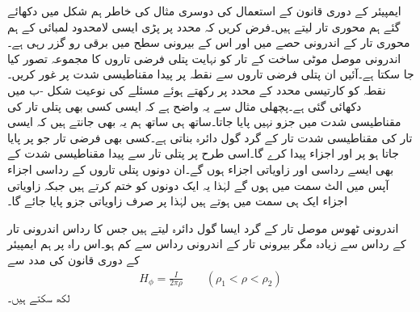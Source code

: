 ایمپیئر کے دوری قانون  کے استعمال کی دوسری مثال کی خاطر ہم شکل  میں دکھائے گئے ہم محوری تار لیتے ہیں۔فرض کریں کہ  محدد پر پڑی  ایسی لامحدود لمبائی کے ہم محوری  تار کے اندرونی حصے میں  اور اس کے بیرونی سطح میں  برقی رو گزر رہی ہے۔اندرونی موصل موٹی ساخت کے تار کو نہایت پتلی فرضی تاروں کا مجموعہ تصور کیا جا سکتا ہے۔آئیں ان پتلی فرضی تاروں سے نقطہ  پر پیدا مقناطیسی شدت پر غور کریں۔نقطہ  کو کارتیسی محدد کے  محدد پر رکھتے ہوئے مسئلے کی نوعیت شکل -ب میں دکھائی گئی ہے۔پچھلی مثال سے یہ واضح ہے کہ ایسی کسی بھی پتلی تار کی مقناطیسی شدت میں  جزو نہیں پایا جاتا۔ساتھ ہی ساتھ ہم یہ بھی جانتے ہیں کہ ایسی تار کی مقناطیسی شدت تار کے گرد گول دائرہ بناتی ہے۔کسی بھی فرضی تار جو  پر پایا جاتا ہو  پر   اور  اجزاء پیدا کرے گا۔اسی طرح  پر پتلی تار سے پیدا مقناطیسی شدت کے بھی ایسے رداسی اور زاویاتی اجزاء ہوں گے۔ان دونوں پتلی تاروں کے رداسی اجزاء آپس میں الٹ سمت میں ہوں گے لہٰذا یہ ایک دونوں کو ختم کرتے ہیں جبکہ زاویاتی اجزاء ایک ہی سمت میں ہوتے ہیں لہٰذا  پر صرف زاویاتی جزو پایا جائے گا۔

اندرونی ٹھوس موصل تار کے گرد ایسا گول دائرہ لیتے ہیں جس کا رداس  اندرونی تار کے رداس  سے زیادہ مگر بیرونی تار کے اندرونی رداس  سے کم ہو۔اس راہ پر ہم ایمپیئر کے دوری قانون کی مدد سے
\begin{align*}
H_{\phi}=\frac{I}{2\pi \rho} \quad \quad (\rho_1 < \rho <\rho_2)
\end{align*}
لکھ سکتے ہیں۔

